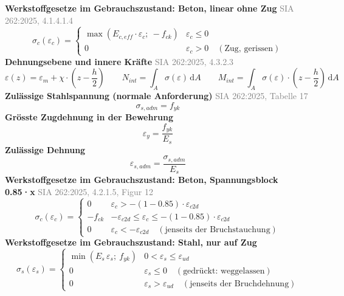\documentclass[11pt,a4paper]{article}
\newcommand{\normref}[1]{{\small\textcolor{gray}{#1}}}
\begin{document}
\noindent\textbf{Werkstoffgesetze im Gebrauchszustand: Beton, linear ohne Zug} \hfill \normref{SIA 262:2025, 4.1.4.1.4}
\begin{equation*}
\sigma_c(\varepsilon_c) = \begin{cases} \max\left(E_{c,eff} \cdot \varepsilon_c;\ -f_{ck}\right) & \varepsilon_c \le 0 \\[1ex] 0 & \varepsilon_c > 0 \quad (\text{Zug, gerissen}) \end{cases}
\end{equation*}
\noindent\textbf{Dehnungsebene und innere Kräfte} \hfill \normref{SIA 262:2025, 4.3.2.3}
\begin{equation*}
\varepsilon(z) = \varepsilon_m + \chi \cdot \left(z - \frac{h}{2}\right) \qquad N_{int} = \int_A \sigma\left(\varepsilon\right)\,\mathrm{d}A \qquad M_{int} = \int_A \sigma\left(\varepsilon\right) \cdot \left(z - \frac{h}{2}\right)\,\mathrm{d}A
\end{equation*}
\noindent\textbf{Zulässige Stahlspannung (normale Anforderung)} \hfill \normref{SIA 262:2025, Tabelle 17}
\begin{equation*}
\sigma_{s,adm} = f_{yk}
\end{equation*}
\noindent\textbf{Grösste Zugdehnung in der Bewehrung}
\begin{equation*}
\varepsilon_y = \frac{f_{yk}}{E_s}
\end{equation*}
\noindent\textbf{Zulässige Dehnung}
\begin{equation*}
\varepsilon_{s,adm} = \frac{\sigma_{s,adm}}{E_s}
\end{equation*}
\noindent\textbf{Werkstoffgesetze im Gebrauchszustand: Beton, Spannungsblock 0.85·x} \hfill \normref{SIA 262:2025, 4.2.1.5, Figur 12}
\begin{equation*}
\sigma_c(\varepsilon_c) = \begin{cases} 0 & \varepsilon_c > -(1 - 0.85) \cdot \varepsilon_{c2d} \\[1ex] -f_{ck} & -\varepsilon_{c2d} \le \varepsilon_c \le -(1 - 0.85) \cdot \varepsilon_{c2d} \\[1ex] 0 & \varepsilon_c < -\varepsilon_{c2d} \quad (\text{jenseits der Bruchstauchung}) \end{cases}
\end{equation*}
\noindent\textbf{Werkstoffgesetze im Gebrauchszustand: Stahl, nur auf Zug}
\begin{equation*}
\sigma_s(\varepsilon_s) = \begin{cases} \min(E_s\,\varepsilon_s;\ f_{yk}) & 0 < \varepsilon_s \le \varepsilon_{ud} \\[1ex] 0 & \varepsilon_s \le 0 \quad (\text{gedrückt: weggelassen}) \\[1ex] 0 & \varepsilon_s > \varepsilon_{ud} \quad (\text{jenseits der Bruchdehnung}) \end{cases}
\end{equation*}
\end{document}
